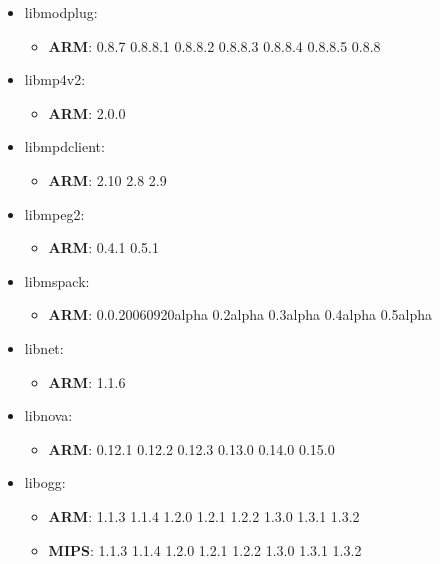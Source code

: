 \documentclass[twocolumn,a4paper]{IEEEtran} %
\begin{document}
\begin{itemize}[noitemsep,topsep=0pt,parsep=0pt,partopsep=0pt]
\item libmodplug:
\begin{itemize}[noitemsep,topsep=0pt,parsep=0pt,partopsep=0pt]
  \item \textbf{ARM}: 0.8.7 0.8.8.1 0.8.8.2 0.8.8.3 0.8.8.4 0.8.8.5 0.8.8
\end{itemize}

\item libmp4v2:
\begin{itemize}[noitemsep,topsep=0pt,parsep=0pt,partopsep=0pt]
  \item \textbf{ARM}: 2.0.0
\end{itemize}

\item libmpdclient:
\begin{itemize}[noitemsep,topsep=0pt,parsep=0pt,partopsep=0pt]
  \item \textbf{ARM}: 2.10 2.8 2.9
\end{itemize}

\item libmpeg2:
\begin{itemize}[noitemsep,topsep=0pt,parsep=0pt,partopsep=0pt]
  \item \textbf{ARM}: 0.4.1 0.5.1
\end{itemize}

\item libmspack:
\begin{itemize}[noitemsep,topsep=0pt,parsep=0pt,partopsep=0pt]
  \item \textbf{ARM}: 0.0.20060920alpha 0.2alpha 0.3alpha 0.4alpha 0.5alpha
\end{itemize}

\item libnet:
\begin{itemize}[noitemsep,topsep=0pt,parsep=0pt,partopsep=0pt]
  \item \textbf{ARM}: 1.1.6
\end{itemize}

\item libnova:
\begin{itemize}[noitemsep,topsep=0pt,parsep=0pt,partopsep=0pt]
  \item \textbf{ARM}: 0.12.1 0.12.2 0.12.3 0.13.0 0.14.0 0.15.0
\end{itemize}

\item libogg:
\begin{itemize}[noitemsep,topsep=0pt,parsep=0pt,partopsep=0pt]
  \item \textbf{ARM}: 1.1.3 1.1.4 1.2.0 1.2.1 1.2.2 1.3.0 1.3.1 1.3.2
  \item \textbf{MIPS}: 1.1.3 1.1.4 1.2.0 1.2.1 1.2.2 1.3.0 1.3.1 1.3.2
\end{itemize}


\end{itemize}
\end{document}
